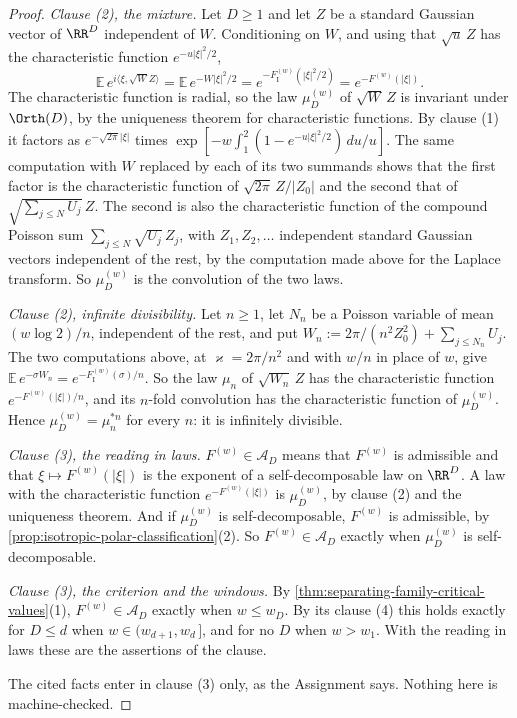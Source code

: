 \begin{proof}
\emph{Clause (2), the mixture.} Let $D \ge 1$ and let $Z$ be a standard Gaussian vector of
$\RR^D$ independent of $W$. Conditioning on $W$, and using that $\sqrt u\,Z$ has the
characteristic function $e^{-u|\xi|^2/2}$,
\[
  \mathbb{E}\,e^{i\langle\xi,\sqrt W Z\rangle} = \mathbb{E}\,e^{-W|\xi|^2/2}
   = e^{-F^{(w)}_{\mathrm I}(|\xi|^2/2)} = e^{-F^{(w)}(|\xi|)} .
\]
The characteristic function is radial, so the law $\mu^{(w)}_D$ of $\sqrt W\,Z$ is invariant
under $\Orth(D)$, by the uniqueness theorem for characteristic functions. By clause (1) it
factors as $e^{-\sqrt{2\pi}|\xi|}$ times
$\exp[-w\int_1^2(1 - e^{-u|\xi|^2/2})\,du/u]$. The same computation with $W$ replaced by each
of its two summands shows that the first factor is the characteristic function of
$\sqrt{2\pi}\,Z/|Z_0|$ and the second that of $\sqrt{\sum_{j\le N}U_j}\,Z$. The second is also
the characteristic function of the compound Poisson sum $\sum_{j \le N}\sqrt{U_j}\,Z_j$, with
$Z_1, Z_2, \dots$ independent standard Gaussian vectors independent of the rest, by the
computation made above for the Laplace transform. So $\mu^{(w)}_D$ is the convolution of the
two laws.

\emph{Clause (2), infinite divisibility.} Let $n \ge 1$, let $N_n$ be a Poisson variable of mean
$(w\log 2)/n$, independent of the rest, and put
$W_n := 2\pi/(n^2Z_0^2) + \sum_{j \le N_n}U_j$. The two computations above, at
$\varkappa = 2\pi/n^2$ and with $w/n$ in place of $w$, give
$\mathbb{E}\,e^{-\sigma W_n} = e^{-F^{(w)}_{\mathrm I}(\sigma)/n}$. So the law $\mu_n$ of
$\sqrt{W_n}\,Z$ has the characteristic function $e^{-F^{(w)}(|\xi|)/n}$, and its $n$-fold
convolution has the characteristic function of $\mu^{(w)}_D$. Hence
$\mu^{(w)}_D = \mu_n^{\ast n}$ for every $n$: it is infinitely divisible.

\emph{Clause (3), the reading in laws.} $F^{(w)} \in \mathcal{A}_D$ means that $F^{(w)}$ is
admissible and that $\xi \mapsto F^{(w)}(|\xi|)$ is the exponent of a self-decomposable law on
$\RR^D$. A law with the characteristic function $e^{-F^{(w)}(|\xi|)}$ is $\mu^{(w)}_D$, by
clause (2) and the uniqueness theorem. And if $\mu^{(w)}_D$ is self-decomposable, $F^{(w)}$ is
admissible, by \ref{prop:isotropic-polar-classification}(2). So $F^{(w)} \in \mathcal{A}_D$
exactly when $\mu^{(w)}_D$ is self-decomposable.

\emph{Clause (3), the criterion and the windows.} By
\ref{thm:separating-family-critical-values}(1), $F^{(w)} \in \mathcal{A}_D$ exactly when
$w \le w_D$. By its clause (4) this holds exactly for $D \le d$ when $w \in (w_{d+1}, w_d\,]$,
and for no $D$ when $w > w_1$. With the reading in laws these are the assertions of the clause.

The cited facts enter in clause (3) only, as the Assignment says. Nothing here is
machine-checked.
\end{proof}

